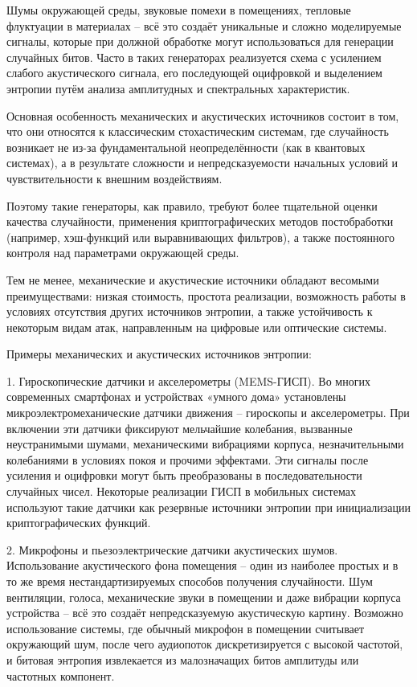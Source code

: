 Шумы окружающей среды, звуковые помехи в помещениях, тепловые флуктуации
в материалах -- всё это создаёт уникальные и сложно моделируемые
сигналы, которые при должной обработке могут использоваться для
генерации случайных битов. Часто в таких генераторах реализуется схема с
усилением слабого акустического сигнала, его последующей оцифровкой и
выделением энтропии путём анализа амплитудных и спектральных
характеристик.

Основная особенность механических и акустических источников состоит в
том, что они относятся к классическим стохастическим системам, где
случайность возникает не из-за фундаментальной неопределённости (как в
квантовых системах), а в результате сложности и непредсказуемости
начальных условий и чувствительности к внешним воздействиям.

Поэтому такие генераторы, как правило, требуют более тщательной оценки
качества случайности, применения криптографических методов постобработки
(например, хэш-функций или выравнивающих фильтров), а также постоянного
контроля над параметрами окружающей среды.

Тем не менее, механические и акустические источники обладают весомыми
преимуществами: низкая стоимость, простота реализации, возможность
работы в условиях отсутствия других источников энтропии, а также
устойчивость к некоторым видам атак, направленным на цифровые или
оптические системы.

Примеры механических и акустических источников энтропии:

1. Гироскопические датчики и акселерометры (MEMS-ГИСП). Во многих
современных смартфонах и устройствах «умного дома» установлены
микроэлектромеханические датчики движения -- гироскопы и акселерометры.
При включении эти датчики фиксируют мельчайшие колебания, вызванные
неустранимыми шумами, механическими вибрациями корпуса, незначительными
колебаниями в условиях покоя и прочими эффектами. Эти сигналы после
усиления и оцифровки могут быть преобразованы в последовательности
случайных чисел. Некоторые реализации ГИСП в мобильных системах
используют такие датчики как резервные источники энтропии при
инициализации криптографических функций.

2. Микрофоны и пьезоэлектрические датчики акустических шумов.
Использование акустического фона помещения -- один из наиболее простых и
в то же время нестандартизируемых способов получения случайности. Шум
вентиляции, голоса, механические звуки в помещении и даже вибрации
корпуса устройства -- всё это создаёт непредсказуемую акустическую
картину. Возможно использование системы, где обычный микрофон в
помещении считывает окружающий шум, после чего аудиопоток
дискретизируется с высокой частотой, и битовая энтропия извлекается из
малозначащих битов амплитуды или частотных компонент.

